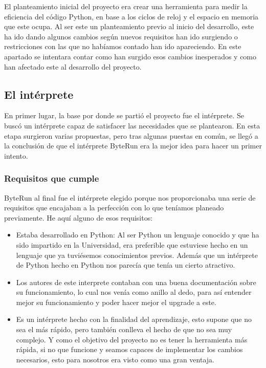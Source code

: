 El planteamiento inicial del proyecto era crear una herramienta para medir la eficiencia del código Python, en base a los ciclos de reloj y el espacio en memoria que este ocupa. Al ser este un planteamiento previo al inicio del desarrollo, este ha ido dando algunos cambios según nuevos requisitos han ido surgiendo o restricciones con las que no habíamos contado han ido apareciendo. En este apartado se intentara contar como han surgido esos cambios inesperados y como han afectado este al desarrollo del proyecto.\\

\subsection{El intérprete}

En primer lugar, la base por donde se partió el proyecto fue el intérprete. Se buscó un intérprete capaz de satisfacer las necesidades que se plantearon. En esta etapa surgieron varias propuestas, pero tras algunas puestas en común, se llegó a la conclusión de que el intérprete ByteRun era la mejor idea para hacer un primer intento.\\

\subsubsection{Requisitos que cumple}
ByteRun al final fue el intérprete elegido porque nos proporcionaba una serie de requisitos que encajaban a la perfección con lo que teníamos planeado previamente. He aquí alguno de esos requisitos:\\

\begin{itemize}
	\item Estaba desarrollado en Python: Al ser Python un lenguaje conocido y que ha sido impartido en la Universidad, era preferible que estuviese hecho en un lenguaje que ya tuviésemos conocimientos previos. Además que un intérprete de Python hecho en Python nos parecía que tenía un cierto atractivo.
	\item Los autores de este interprete contaban con una buena documentación sobre su funcionamiento\cite{ByteRunGithub}, lo cual nos venía como anillo al dedo, para así entender mejor su funcionamiento y poder hacer mejor el upgrade a este.
	\item Es un intérprete hecho con la finalidad del aprendizaje, esto supone que no sea el más rápido, pero también conlleva el hecho de que no sea muy complejo. Y como el objetivo del proyecto no es tener la herramienta más rápida, si no que funcione y seamos capaces de implementar los cambios necesarios, esto para nosotros era visto como una gran ventaja.
\end{itemize}

